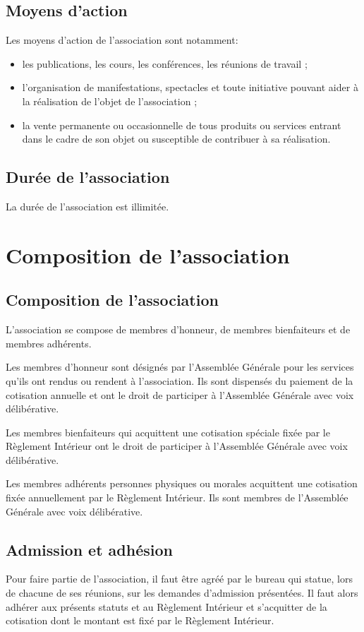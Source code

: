 \documentclass[a4paper,french,10pt]{article}
\begin{document}
\subsection{Moyens d’action}
\label{sec:moyens}

Les moyens d’action de l’association sont notamment:
\begin{itemize}
\item les publications, les cours, les conférences, les réunions de
travail ;
\item l’organisation de manifestations, spectacles et toute initiative
pouvant aider à la réalisation de l’objet de l’association ;
\item la vente permanente ou occasionnelle de tous produits ou
services entrant dans le cadre de son objet ou susceptible de
contribuer à sa réalisation.
\end{itemize}

\subsection{Durée de l’association}
\label{sec:duree}
La durée de l’association est illimitée.

\section{Composition de l’association}

\subsection{Composition de l’association}
\label{sec:composition}
L’association se compose de membres d'honneur, de membres bienfaiteurs
et de membres adhérents.

Les membres d'honneur sont désignés par l'Assemblée Générale pour les
services qu'ils ont rendus ou rendent à l'association. Ils sont
dispensés du paiement de la cotisation annuelle et ont le droit de
participer à l'Assemblée Générale avec voix délibérative.

Les membres bienfaiteurs qui acquittent une cotisation spéciale fixée
par le Règlement Intérieur ont le droit de participer à l'Assemblée
Générale avec voix délibérative.

Les membres adhérents personnes physiques ou morales acquittent une
cotisation fixée annuellement par le Règlement Intérieur. Ils sont
membres de l'Assemblée Générale avec voix délibérative.

\subsection{Admission et adhésion}
\label{sec:admission}
Pour faire partie de l’association, il faut être agréé par le bureau
qui statue, lors de chacune de ses réunions, sur les demandes
d'admission présentées. Il faut alors adhérer aux présents
statuts et au Règlement Intérieur et s’acquitter de la cotisation dont le montant est fixé par le Règlement Intérieur.
\end{document}
